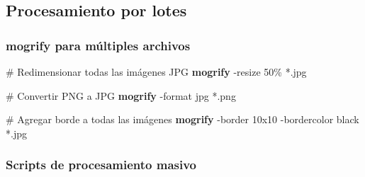 \documentclass[
  11pt,
  letterpaper,
  oneside,
  openany]{scrbook}
\newenvironment{Shaded}{}{}
\newcommand{\AttributeTok}[1]{\textcolor[rgb]{0.84,0.23,0.29}{#1}}
\newcommand{\CommentTok}[1]{\textcolor[rgb]{0.42,0.45,0.49}{#1}}
\newcommand{\ExtensionTok}[1]{\textcolor[rgb]{0.84,0.23,0.29}{\textbf{#1}}}
\newcommand{\NormalTok}[1]{\textcolor[rgb]{0.14,0.16,0.18}{#1}}
\newcommand{\PreprocessorTok}[1]{\textcolor[rgb]{0.84,0.23,0.29}{#1}}
\begin{document}
\subsection{Procesamiento por lotes}\label{procesamiento-por-lotes}

\subsubsection{mogrify para múltiples
archivos}\label{mogrify-para-muxfaltiples-archivos}

\begin{Shaded}
\begin{Highlighting}[]
\CommentTok{\# Redimensionar todas las imágenes JPG}
\ExtensionTok{mogrify} \AttributeTok{{-}resize}\NormalTok{ 50\% }\PreprocessorTok{*}\NormalTok{.jpg}

\CommentTok{\# Convertir PNG a JPG}
\ExtensionTok{mogrify} \AttributeTok{{-}format}\NormalTok{ jpg }\PreprocessorTok{*}\NormalTok{.png}

\CommentTok{\# Agregar borde a todas las imágenes}
\ExtensionTok{mogrify} \AttributeTok{{-}border}\NormalTok{ 10x10 }\AttributeTok{{-}bordercolor}\NormalTok{ black }\PreprocessorTok{*}\NormalTok{.jpg}
\end{Highlighting}
\end{Shaded}

\subsubsection{Scripts de procesamiento
masivo}\label{scripts-de-procesamiento-masivo}
\end{document}
